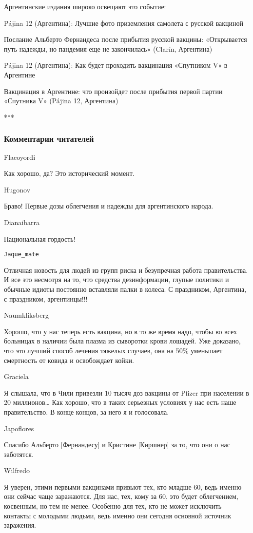 Аргентинские издания широко освещают это событие:

Pájina 12 (Аргентина): Лучшие фото приземления самолета с русской вакциной  

Послание Альберто Фернандеса после прибытия русской вакцины: «Открывается путь
надежды, но пандемия еще не закончилась» (Clarín, Аргентина) 

Pájina 12 (Аргентина): Как будет проходить вакцинация «Спутником V» в Аргентине

Вакцинация в Аргентине: что произойдет после прибытия первой партии «Спутника
V» (Pájina 12, Аргентина)

***

\subsubsection{Комментарии читателей}

Flacoyordi

Как хорошо, да? Это исторический момент.

Hugonov 

Браво! Первые дозы облегчения и надежды для аргентинского народа.

Dianaibarra

Национальная гордость!

\verb|Jaque_mate|

Отличная новость для людей из групп риска и безупречная работа правительства. И
все это несмотря на то, что средства дезинформации, глупые политики и обычные
идиоты постоянно вставляли палки в колеса. С праздником, Аргентина, с
праздником, аргентинцы!!!

Naumkliksberg

Хорошо, что у нас теперь есть вакцина, но в то же время надо, чтобы во всех
больницах в наличии была плазма из сыворотки крови лошадей. Уже доказано, что
это лучший способ лечения тяжелых случаев, она на 50\% уменьшает смертность от
ковида и освобождает койки.

Graciela

Я слышала, что в Чили привезли 10 тысяч доз вакцины от Pfizer при населении в
20 миллионов… Как хорошо, что в таких серьезных условиях у нас есть наше
правительство. В конце концов, за него я и голосовала.

Japoflores 

Спасибо Альберто [Фернандесу] и Кристине [Киршнер] за то, что они о нас
заботятся.

Wilfredo

Я уверен, этими первыми вакцинами привьют тех, кто младше 60, ведь именно они
сейчас чаще заражаются. Для нас, тех, кому за 60, это будет облегчением,
косвенным, но тем не менее. Особенно для тех, кто не может исключить контакты с
молодыми людьми, ведь именно они сегодня основной источник заражения.

